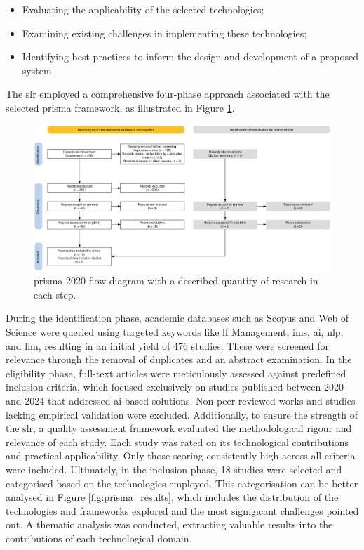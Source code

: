 \begin{itemize}
    \item Evaluating the applicability of the selected technologies;
    \item Examining existing challenges in implementing these technologies;
    \item Identifying best practices to inform the design and development of a proposed system.
\end{itemize}

The \ac{slr} employed a comprehensive four-phase approach associated with the selected \ac{prisma} framework, as illustrated in Figure \ref{fig:prisma_workflow}.

\begin{figure}[!htb]
    \includegraphics[width=\textwidth]{figs/chapter2/prisma.png}
    \centering
    \caption[\acs{prisma} 2020 flow diagram with a described quantity of research in each step.]{\acs{prisma} 2020 flow diagram with a described quantity of research in each step.}
    \label{fig:prisma_workflow}
\end{figure}

During the identification phase, academic databases such as Scopus and Web of Science were queried using targeted keywords like \ac{lf} Management, \ac{ims}, \ac{ai}, \ac{nlp}, and \ac{llm}, resulting in an initial yield of 476 studies. These were screened for relevance through the removal of duplicates and an abstract examination. In the eligibility phase, full-text articles were meticulously assessed against predefined inclusion criteria, which focused exclusively on studies published between 2020 and 2024 that addressed \ac{ai}-based solutions. Non-peer-reviewed works and studies lacking empirical validation were excluded. Additionally, to ensure the strength of the \ac{slr}, a quality assessment framework evaluated the methodological rigour and relevance of each study. Each study was rated on its technological contributions and practical applicability. Only those scoring consistently high across all criteria were included. Ultimately, in the inclusion phase, 18 studies were selected and categorised based on the technologies employed. This categorisation can be better analysed in Figure \ref{fig:prisma_results}, which includes the distribution of the technologies and frameworks explored and the most signigicant challenges pointed out. A thematic analysis was conducted, extracting valuable results into the contributions of each technological domain.

